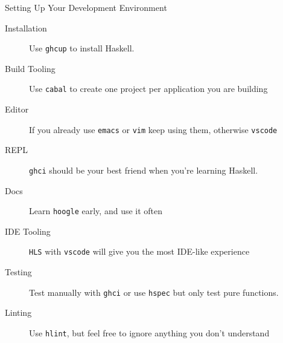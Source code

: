 \documentclass[10pt, presentation, colorlinks]{beamer}
\begin{document}
\begin{frame}[label={sec:org07ef356},fragile]{Setting Up Your Development Environment}
 \pause
\begin{description}
\item[{Installation}] Use \alert{\texttt{ghcup}} to install Haskell.
\end{description}
\pause
\begin{description}
\item[{Build Tooling}] Use \alert{\texttt{cabal}} to create one project per application you are building
\end{description}
\pause
\begin{description}
\item[{Editor}] If you already use \alert{\texttt{emacs}} or \alert{\texttt{vim}} keep using them, otherwise \alert{\texttt{vscode}}
\end{description}
\pause
\begin{description}
\item[{REPL}] \alert{\texttt{ghci}} should be your best friend when you're learning Haskell.
\end{description}
\pause
\begin{description}
\item[{Docs}] Learn \alert{\texttt{hoogle}} early, and use it often
\end{description}
\pause
\begin{description}
\item[{IDE Tooling}] \alert{\texttt{HLS}} with \alert{\texttt{vscode}} will give you the most IDE-like experience
\end{description}
\pause
\begin{description}
\item[{Testing}] Test manually with \alert{\texttt{ghci}} or use \alert{\texttt{hspec}} but only test pure functions.
\end{description}
\pause
\begin{description}
\item[{Linting}] Use \alert{\texttt{hlint}}, but feel free to ignore anything you don't understand
\end{description}
\end{frame}
\end{document}

